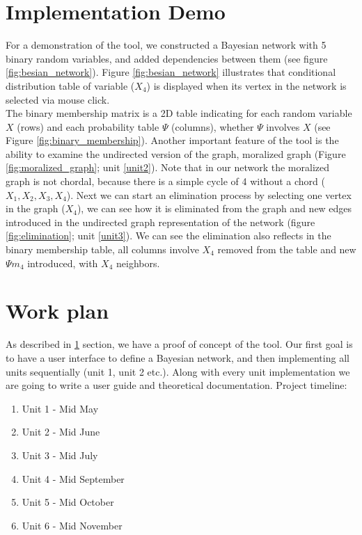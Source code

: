 \documentclass{article}
\begin{document}
    \section{Implementation Demo}\label{sec:demo}
    For a demonstration of the tool, we constructed a Bayesian network with 5 binary random variables, and added dependencies between them (see figure \ref{fig:besian_network}). Figure \ref{fig:besian_network} illustrates that conditional distribution table of variable ($X_4$) is displayed when its vertex in the network is selected via mouse click.\\

    The binary membership matrix is a 2D table indicating for each random variable $X$ (rows) and each probability table $\Psi$ (columns), whether $\Psi$ involves $X$ (see Figure \ref{fig:binary_membership}).
    Another important feature of the tool is the ability to examine the undirected version of the graph, moralized graph (Figure \ref{fig:moralized_graph}; unit \ref{unit2}).
    Note that in our network the moralized graph is not chordal, because there is a simple cycle of 4 without a chord ($X_1, X_2, X_3, X_4$).
    Next we can start an elimination process by selecting one vertex in the graph ($X_4$), we can see how it is eliminated from the graph and new edges introduced in the undirected graph representation of the network (figure \ref{fig:elimination}; unit \ref{unit3}). We can see the elimination also reflects in the binary membership table, all columns involve $X_4$ removed from the table and new $\Psi m_4$ introduced, with $X_4$ neighbors.

    \section{Work plan}
    As described in \ref{sec:demo} section, we have a proof of concept of the tool. Our first goal is to have a user interface to define a Bayesian network, and then implementing all units sequentially (unit 1, unit 2 etc.). Along with every unit implementation we are going to write a user guide and theoretical documentation. Project timeline:
    \begin{enumerate}
        \item Unit 1 - Mid May
        \item Unit 2 - Mid June
        \item Unit 3 - Mid July
        \item Unit 4 - Mid September
        \item Unit 5 - Mid October
        \item Unit 6 - Mid November
    \end{enumerate}
\end{document}
